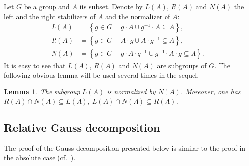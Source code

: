 \documentclass[11pt]{amsart}
\theoremstyle{plain}
\numberwithin{equation}{section}
\newtheorem{lemma}{Lemma}
\numberwithin{lemma}{section}
\theoremstyle{definition}
\theoremstyle{remark}
\begin{document}
Let $G$ be a group and $A$ its subset. Denote by $L(A)$, $R(A)$ and $N(A)$ the left and the right stabilizers of $A$ and the normalizer of $A$:
\begin{align*} 
 L(A) & =  \left\{ g\in G\ \middle |\ g \cdot A \cup g^{-1} \cdot A \subseteq A \right\}\!,\\
 R(A) & =  \left\{ g\in G\ \middle |\ A \cdot g \cup A \cdot g^{-1} \subseteq A \right\}\!,\\
 N(A) & =  \left\{ g\in G\ \middle |\ g \cdot A \cdot g^{-1} \cup g^{-1} \cdot A \cdot g \subseteq A \right\}.
\end{align*}
It is easy to see that $L(A)$, $R(A)$ and $N(A)$ are subgroups of $G$. The following obvious lemma will be used several times in the sequel.
\begin{lemma} \label{lem:LN} The subgroup $L(A)$ is normalized by $N(A)$. Moreover, one has $R(A) \cap N(A) \subseteq L(A)$, $L(A) \cap N(A) \subseteq R(A)$. \end{lemma}
\begin{comment}
\begin{proof}
Let $h \in L(A)$, $g \in N(A)$. The first claim follows from the following chain of inclusions:
\begin{equation} h^g \cdot A = g^{-1} \cdot h \cdot g \cdot A \cdot g^{-1} \cdot g \subseteq g^{-1} \cdot h \cdot A \cdot g \subseteq {A}^g \subseteq A. \end{equation} 
Now if, in addition, $g \in R(A)$ we obtain
$g \cdot A = g \cdot A \cdot g^{-1} \cdot g \subseteq A \cdot g \subseteq A,$ which implies the second claim.
\end{proof}
\end{comment}

\subsection{Relative Gauss decomposition}\label{sec:gauss}
The proof of the Gauss decomposition presented below is similar to the proof in the absolute case (cf.~\cite[Theorem~5.1]{Sm12}).
\end{document}
